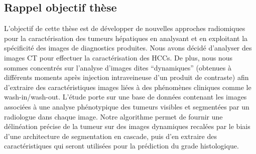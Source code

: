 \documentclass[]{memoir}
\begin{document}
\subsection{Rappel objectif thèse}
L’objectif de cette thèse est de développer de nouvelles approches radiomiques pour la caractérisation des tumeurs hépatiques en analysant et en exploitant la spécificité des images de diagnostics produites. Nous avons décidé d’analyser des images CT pour effectuer la caractérisation des HCCs. De plus, nous nous sommes concentrés sur l’analyse d’images dites “dynamiques” (obtenues à différents moments après injection intraveineuse d’un produit de contraste) afin d’extraire des caractéristiques images liées à des phénomènes cliniques comme le wash-in/wash-out.
L’étude porte sur une base de données contenant les images associées à une analyse phénotypique des tumeurs visibles et segmentées par un radiologue dans chaque image.
Notre algorithme permet de fournir une délinéation précise de la tumeur sur des images dynamiques recalées par le biais d’une architecture de segmentation en cascade, puis d’en extraire des caractéristiques qui seront utilisées pour la prédiction du grade histologique.  
\end{document}
